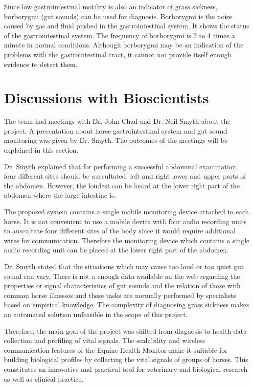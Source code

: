 Since low gastrointestinal motility is also an indicator of grass sickness, borborygmi (gut sounds) can be used for diagnosis. Borborygmi is the noise caused by gas and fluid pushed in the gastrointestinal system. It shows the status of the gastrointestinal system. The frequency of borborygmi is 2 to 4 times a minute in normal conditions. Although borborygmi may be an indication of the problems with the gastrointestinal tract, it cannot not provide itself enough evidence to detect them. \cite{corley2009equine}


\section{Discussions with Bioscientists}
\label{sec:research_discussion}
The team had meetings with Dr. John Chad and Dr. Neil Smyth about the project. A presentation about horse gastrointestinal system and gut sound monitoring was given by Dr. Smyth. The outcomes of the meetings will be explained in this section. 

Dr. Smyth explained that for performing a successful abdominal examination, four different sites should be auscultated: left and right lower and upper parts of the abdomen. However, the loudest can be heard at the lower right part of the abdomen where the large intestine is. 

The proposed system contains a single mobile monitoring device attached to each horse. It is not convenient to use a mobile device with four audio recording units to auscultate four different sites of the body since it would require additional wires for communication. Therefore the monitoring device which contains a single audio recording unit can be placed at the lower right part of the abdomen.

Dr. Smyth stated that the situations which may cause too loud or too quiet gut sound can vary. There is not a enough data available on the web regarding the properties or signal characteristics of gut sounds and the relation of those with common horse illnesses and these tasks are normally performed by specialists based on empirical knowledge. The complexity of diagnosing grass sickness makes an automated solution unfeasible in the scope of this project. 

Therefore, the main goal of the project was shifted from diagnosis to health data collection and profiling of vital signals. The scalability and wireless communication features of the Equine Health Monitor make it suitable for building biological profiles by collecting the vital signals of groups of horses. This constitutes an innovative and practical tool for veterinary and biological research as well as clinical practice. 
